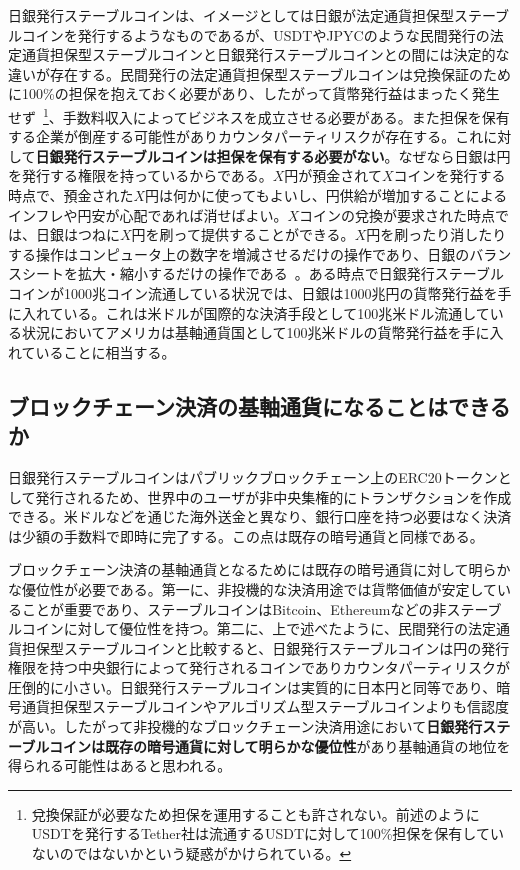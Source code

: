 \documentclass[dvipdfmx,a4paper]{jsarticle}
\begin{document}
日銀発行ステーブルコインは、イメージとしては日銀が法定通貨担保型ステーブルコインを発行するようなものであるが、USDTやJPYCのような民間発行の法定通貨担保型ステーブルコインと日銀発行ステーブルコインとの間には決定的な違いが存在する。民間発行の法定通貨担保型ステーブルコインは兌換保証のために100\%の担保を抱えておく必要があり、したがって貨幣発行益はまったく発生せず~\footnote{兌換保証が必要なため担保を運用することも許されない。前述のようにUSDTを発行するTether社は流通するUSDTに対して100\%担保を保有していないのではないかという疑惑がかけられている。}、手数料収入によってビジネスを成立させる必要がある。また担保を保有する企業が倒産する可能性がありカウンタパーティリスクが存在する。これに対して\textbf{日銀発行ステーブルコインは担保を保有する必要がない}。なぜなら日銀は円を発行する権限を持っているからである。$X$円が預金されて$X$コインを発行する時点で、預金された$X$円は何かに使ってもよいし、円供給が増加することによるインフレや円安が心配であれば消せばよい。$X$コインの兌換が要求された時点では、日銀はつねに$X$円を刷って提供することができる。$X$円を刷ったり消したりする操作はコンピュータ上の数字を増減させるだけの操作であり、日銀のバランスシートを拡大・縮小するだけの操作である~\cite{mmt2016wray}。ある時点で日銀発行ステーブルコインが1000兆コイン流通している状況では、日銀は1000兆円の貨幣発行益を手に入れている。これは米ドルが国際的な決済手段として100兆米ドル流通している状況においてアメリカは基軸通貨国として100兆米ドルの貨幣発行益を手に入れていることに相当する。

\subsection{ブロックチェーン決済の基軸通貨になることはできるか}

日銀発行ステーブルコインはパブリックブロックチェーン上のERC20トークンとして発行されるため、世界中のユーザが非中央集権的にトランザクションを作成できる。米ドルなどを通じた海外送金と異なり、銀行口座を持つ必要はなく決済は少額の手数料で即時に完了する。この点は既存の暗号通貨と同様である。

ブロックチェーン決済の基軸通貨となるためには既存の暗号通貨に対して明らかな優位性が必要である。第一に、非投機的な決済用途では貨幣価値が安定していることが重要であり、ステーブルコインはBitcoin、Ethereumなどの非ステーブルコインに対して優位性を持つ。第二に、上で述べたように、民間発行の法定通貨担保型ステーブルコインと比較すると、日銀発行ステーブルコインは円の発行権限を持つ中央銀行によって発行されるコインでありカウンタパーティリスクが圧倒的に小さい。日銀発行ステーブルコインは実質的に日本円と同等であり、暗号通貨担保型ステーブルコインやアルゴリズム型ステーブルコインよりも信認度が高い。したがって非投機的なブロックチェーン決済用途において\textbf{日銀発行ステーブルコインは既存の暗号通貨に対して明らかな優位性}があり基軸通貨の地位を得られる可能性はあると思われる。
\end{document}
